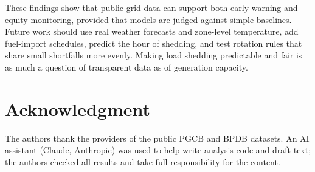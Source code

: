 \documentclass[conference]{IEEEtran}
\newif\iffullfigs
\begin{document}
These findings show that public grid data can support both early warning and equity monitoring, provided that models are judged against simple baselines. Future work should use real weather forecasts and zone-level temperature, add fuel-import schedules, predict the hour of shedding, and test rotation rules that share small shortfalls more evenly. Making load shedding predictable and fair is as much a question of transparent data as of generation capacity.

\section*{Acknowledgment}
The authors thank the providers of the public PGCB and BPDB datasets. An AI assistant (Claude, Anthropic) was used to help write analysis code and draft text; the authors checked all results and take full responsibility for the content.



\iffullfigs
\clearpage
\onecolumn
\end{document}
